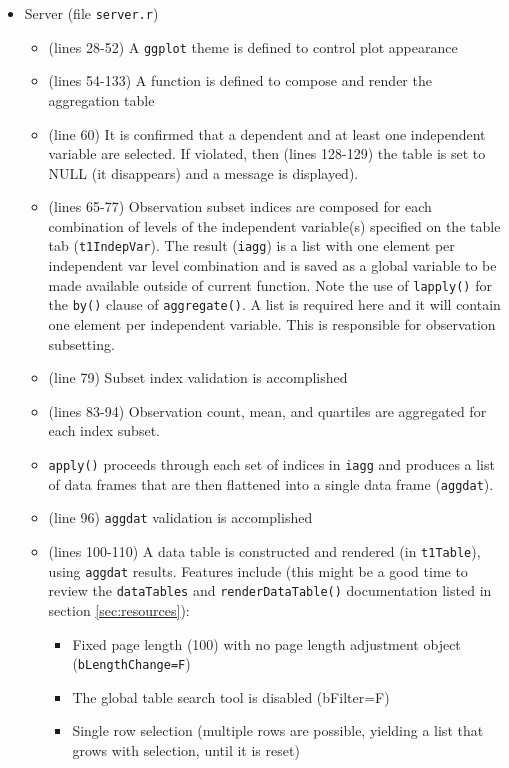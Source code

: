 \documentclass[10pt, letterpaper]{article}
\begin{document}
\begin{spacing}{1.0}
\begin{itemize}
    \item Server (file \texttt{server.r})
      \begin{itemize}
        \item (lines 28-52) A \texttt{ggplot} theme is defined to control plot appearance
        \item (lines 54-133) A function is defined to compose and render the aggregation table        
        \item (line 60) It is confirmed that a dependent and at least one independent variable are selected.  If violated, then (lines 128-129) the table is set to NULL (it disappears) and a message is displayed).
        \item (lines 65-77) Observation subset indices are composed for each combination of levels of the independent variable(s) specified on the table tab (\texttt{t1IndepVar}).  The result (\texttt{iagg}) is a list with one element per independent var level combination and is saved as a global variable to be made available outside of current function.  Note the use of \texttt{lapply()} for the \texttt{by()} clause of \texttt{aggregate()}.  A list is required here and it will contain one element per independent variable.  This is responsible for observation subsetting.
        \item (line 79) Subset index validation is accomplished
        \item (lines 83-94) Observation count, mean, and quartiles are aggregated for each index subset.  \item \texttt{apply()} proceeds through each set of indices in \texttt{iagg} and produces a list of data frames that are then flattened into a single data frame (\texttt{aggdat}).
        \item (line 96) \texttt{aggdat} validation is accomplished
        \item (lines 100-110) A data table is constructed and rendered (in \texttt{t1Table}), using \texttt{aggdat} results.  Features include (this might be a good time to review the \texttt{dataTables} and \texttt{renderDataTable()} documentation listed in section \ref{sec:resources}):
          \begin{itemize}
              \item Fixed page length (100) with no page length adjustment object (\texttt{bLengthChange=F})
              \item The global table search tool is disabled (bFilter=F)
              \item Single row selection (multiple rows are possible, yielding a list that grows with selection, until it is reset)

\end{itemize}
\end{itemize}
\end{itemize}
\end{spacing}
\end{document}
